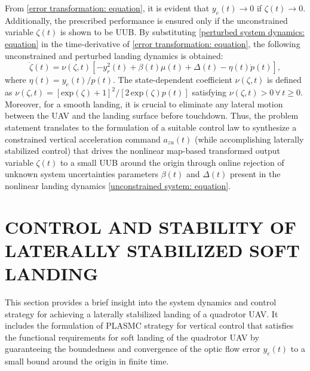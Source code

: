 \documentclass{IEEEtaes}
\begin{document}
From \eqref{error transformation: equation}, it is evident that $y_e(t) \rightarrow 0$ if $\zeta(t) \to 0$. Additionally, the prescribed performance is ensured only if the unconstrained variable $\zeta(t)$ is shown to be UUB. By substituting \eqref{perturbed system dynamics: equation} in the time-derivative of \eqref{error transformation: equation}, the following unconstrained and perturbed landing dynamics is obtained:
\begin{equation} \label{unconstrained system: equation}
    \dot{\zeta}(t) {=} \nu(\zeta,t) \left[{-}y_r^2(t) {+} \beta(t) \mu(t) {+} \Delta(t) {-} \eta(t) \dot{p}(t) \right],
\end{equation}
where $\eta(t)=y_e(t)/p(t)$. The state-dependent coefficient $\nu(\zeta,t)$ is defined as $\nu(\zeta,t) = [\text{exp}(\zeta){+}1]^2/[2\,\text{exp}(\zeta) p(t)]$ satisfying $\nu(\zeta,t)>0\,\forall\,t\geq 0$.
Moreover, for a smooth landing, it is crucial to eliminate any lateral motion between the UAV and the landing surface before touchdown.
Thus, the problem statement translates to the formulation of a suitable control law to synthesize a constrained vertical acceleration command $a_{zu}(t)$ (while
accomplishing laterally stabilized control) that drives the nonlinear map-based transformed output variable $\zeta(t)$ to a small UUB around the origin through online rejection of unknown system uncertainties parameters $\beta(t)$ and $\Delta(t)$ present in the nonlinear landing dynamics \eqref{unconstrained system: equation}.

\section{CONTROL AND STABILITY OF LATERALLY STABILIZED SOFT LANDING} \label{control strategy: section}
This section provides a brief insight into the system dynamics and control strategy for achieving a laterally stabilized landing of a quadrotor UAV. It includes the formulation of PLASMC strategy for vertical control that satisfies the functional requirements for soft landing of the quadrotor UAV by guaranteeing the boundedness and convergence of the optic flow error $y_e(t)$ to a small bound around the origin in finite time.
\end{document}
